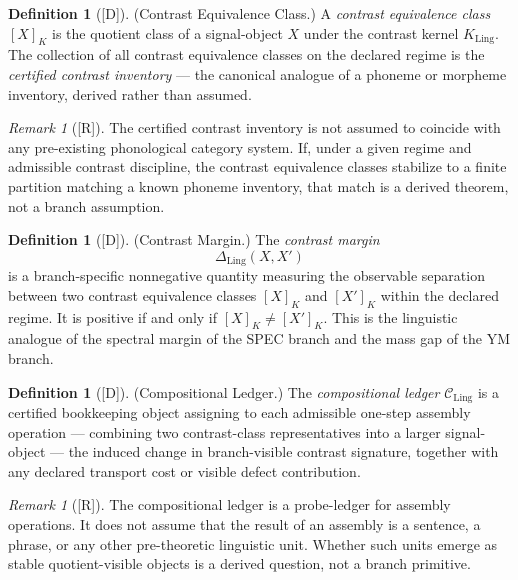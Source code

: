 \documentclass[12pt,oneside]{amsbook}
\theoremstyle{plain}
\theoremstyle{definition}
\newtheorem{definition}[theorem]{Definition}
\theoremstyle{remark}
\newtheorem{remark}[theorem]{Remark}
\newcommand{\status}[1]{\textup{[#1]}}
\begin{document}
\begin{definition}[\status{D}]\label{def:ling-contrast-equivalence}
\textup{(Contrast Equivalence Class.)}
A \emph{contrast equivalence class} $[X]_{K}$ is the quotient class of
a signal-object $X$ under the contrast kernel $K_{\mathrm{Ling}}$.
The collection of all contrast equivalence classes on the declared
regime is the \emph{certified contrast inventory} --- the canonical
analogue of a phoneme or morpheme inventory, derived rather than
assumed.
\end{definition}

\begin{remark}[\status{R}]\label{rem:ling-phoneme-remark}
The certified contrast inventory is not assumed to coincide with any
pre-existing phonological category system. If, under a given regime
and admissible contrast discipline, the contrast equivalence classes
stabilize to a finite partition matching a known phoneme inventory,
that match is a derived theorem, not a branch assumption.
\end{remark}

\begin{definition}[\status{D}]\label{def:ling-contrast-margin}
\textup{(Contrast Margin.)}
The \emph{contrast margin}
\[
 \Delta_{\mathrm{Ling}}(X, X')
\]
is a branch-specific nonnegative quantity measuring the observable
separation between two contrast equivalence classes $[X]_{K}$ and
$[X']_{K}$ within the declared regime. It is positive if and only if
$[X]_{K} \neq [X']_{K}$. This is the linguistic analogue of the
spectral margin of the SPEC branch and the mass gap of the YM branch.
\end{definition}

\begin{definition}[\status{D}]\label{def:ling-compositional-ledger}
\textup{(Compositional Ledger.)}
The \emph{compositional ledger} $\mathcal{C}_{\mathrm{Ling}}$ is a
certified bookkeeping object assigning to each admissible one-step
assembly operation --- combining two contrast-class representatives
into a larger signal-object --- the induced change in branch-visible
contrast signature, together with any declared transport cost or visible
defect contribution.
\end{definition}

\begin{remark}[\status{R}]\label{rem:ling-compositionality-remark}
The compositional ledger is a probe-ledger for assembly operations.
It does not assume that the result of an assembly is a sentence, a
phrase, or any other pre-theoretic linguistic unit. Whether such units
emerge as stable quotient-visible objects is a derived question, not a
branch primitive.
\end{remark}
\end{document}
